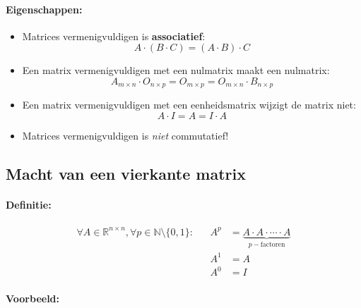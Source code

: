 \documentclass[12pt,twoside]{article}
\begin{document}
\paragraph*{Eigenschappen:}
\begin{itemize}
\item Matrices vermenigvuldigen is {\bf associatief}:
  \[A \cdot (B \cdot C) = (A \cdot B) \cdot C\]
\item Een matrix vermenigvuldigen met een nulmatrix maakt een nulmatrix:
  \[A_{m \times n} \cdot O_{n \times p} = O_{m \times p} = O_{m \times n} \cdot B_{n \times p}\]
\item Een matrix vermenigvuldigen met een eenheidsmatrix wijzigt de matrix niet:
  \[A \cdot I = A = I \cdot A\]
\item Matrices vermenigvuldigen is {\em niet} commutatief!
\end{itemize}

\subsection{Macht van een vierkante matrix}

\paragraph*{Definitie:}

\begin{align*}
  \forall A \in \mathbb{R}^{n \times n} , \forall p \in \mathbb{N} \setminus \{0, 1\} :
 &  & A^p & = \underbrace{A \cdot A \cdot \cdots \cdot A}_{p-\text{factoren}} \\
 &  & A^1 & = A                         \\
 &  & A^0 & = I
\end{align*}

\paragraph*{Voorbeeld:}
\end{document}
